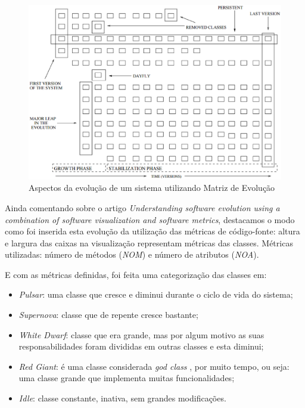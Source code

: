 \begin{figure}[!htb]
  \centering
    \includegraphics[keepaspectratio=true,scale=0.5]
    {figuras/evolutionMatrixAspects.eps}
  \caption{Aspectos da evolução de um sistema utilizando Matriz de Evolução
  \cite{Lanza02understandingsoftware}}
  \label{fig:evolutionMatrixAspects}
\end{figure}


Ainda comentando sobre o artigo \textit{Understanding software evolution using
a combination of software visualization and software metrics}, destacamos
o modo como foi inserida esta evolução da utilização das métricas de código-fonte:
altura e largura das caixas na visualização representam métricas das
classes. Métricas utilizadas: número de métodos (\textit{NOM}) e número de
atributos (\textit{NOA}).

E com as métricas definidas, foi feita uma categorização das classes em:

\begin{itemize}
  \item \textit{Pulsar}: uma classe que cresce e diminui durante o ciclo de
  vida do sistema;
  \item \textit{Supernova}: classe que de repente cresce bastante;
  \item \textit{White Dwarf}: classe que era grande, mas por algum motivo as
  suas responsabilidades foram divididas em outras classes e esta diminui;
  \item \textit{Red Giant}: é uma classe considerada \textit{god class}
  \cite{riel1996object}, por muito tempo, ou seja: uma classe grande que
  implementa muitas funcionalidades;
  \item \textit{Idle}: classe constante, inativa, sem grandes modificações.
\end{itemize}

